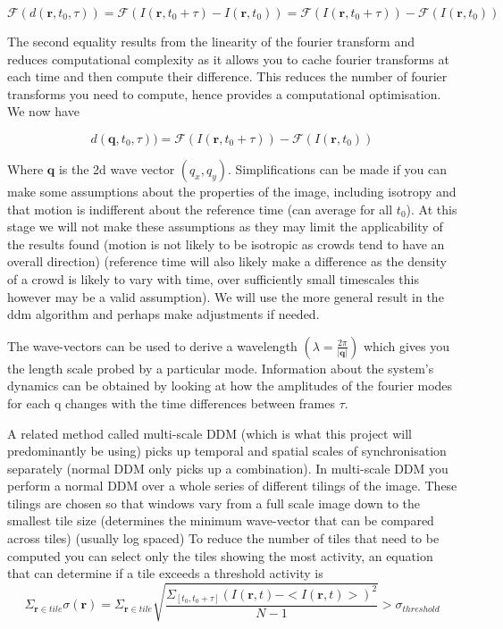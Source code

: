 \documentclass[11pt]{article}
\begin{document}
\begin{equation}
    \mathscr{F} (d(\textbf{r}, t_0, \tau) ) = \mathscr{F} (I(\mathbf{r}, t_0 + \tau) - I(\mathbf{r}, t_0)) = \mathscr{F}(I(\mathbf{r}, t_0 + \tau)) - \mathscr{F}(I(\mathbf{r}, t_0))
\end{equation}

The second equality results from the linearity of the fourier transform and reduces computational complexity as it allows you to cache fourier transforms at each time and then compute their difference.
This reduces the number of fourier transforms you need to compute, hence provides a computational optimisation.\cite{ddm2}
We now have

\begin{equation}
    d(\textbf{q}, t_0, \tau) ) = \mathscr{F}(I(\mathbf{r}, t_0 + \tau)) - \mathscr{F}(I(\mathbf{r}, t_0))
\end{equation}

Where $\textbf{q}$ is the 2d wave vector $(q_x, q_y)$.
Simplifications can be made if you can make some assumptions about the properties of the image, including isotropy and that motion is indifferent about the reference time (can average for all $t_0$).\cite{ddm1}
At this stage we will not make these assumptions as they may limit the applicability of the results found (motion is not likely to be isotropic as crowds tend to have an overall direction)
(reference time will also likely make a difference as the density of a crowd is likely to vary with time, over sufficiently small timescales this however may be a valid assumption).
We will use the more general result in the ddm algorithm and perhaps make adjustments if needed.

The wave-vectors can be used to derive a wavelength $(\lambda = \frac{2\pi}{|\textbf{q}|})$ which gives you the length scale probed by a particular mode.
Information about the system's dynamics can be obtained by looking at how the amplitudes of the fourier modes for each q changes with the time differences between frames $\tau$.\cite{ddm2}

A related method called multi-scale DDM (which is what this project will predominantly be using) picks up temporal and spatial scales of synchronisation separately (normal DDM only picks up a combination).
In multi-scale DDM you perform a normal DDM over a whole series of different tilings of the image.\cite{ddm1}
These tilings are chosen so that windows vary from a full scale image down to the smallest tile size (determines the minimum wave-vector that can be compared across tiles) (usually log spaced)\cite{ddm1}
To reduce the number of tiles that need to be computed you can select only the tiles showing the most activity, an equation that can determine if a tile exceeds a threshold activity is
\begin{equation}
    \Sigma_{\textbf{r} \in tile} \sigma(\textbf{r}) = \Sigma_{\textbf{r} \in tile} \sqrt{\frac{\Sigma_{[t_0, t_0 + \tau]} (I(\mathbf{r}, t) - <I(\mathbf{r}, t)>)^2}{N - 1}} > \sigma_{threshold}
\end{equation}
\end{document}
